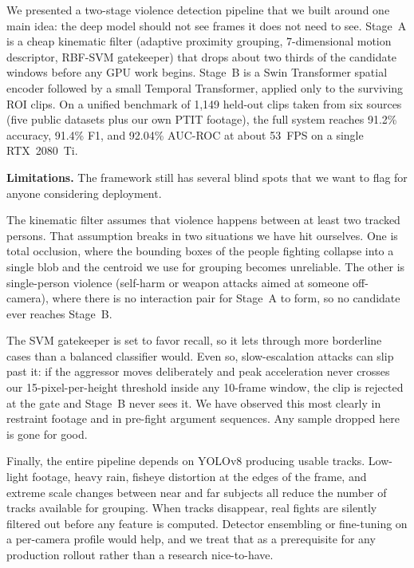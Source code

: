 \documentclass[conference]{IEEEtran}
\begin{document}
We presented a two-stage violence detection pipeline that we built around one main idea: the deep model should not see frames it does not need to see. Stage~A is a cheap kinematic filter (adaptive proximity grouping, 7-dimensional motion descriptor, RBF-SVM gatekeeper) that drops about two thirds of the candidate windows before any GPU work begins. Stage~B is a Swin Transformer spatial encoder followed by a small Temporal Transformer, applied only to the surviving ROI clips. On a unified benchmark of 1,149 held-out clips taken from six sources (five public datasets plus our own PTIT footage), the full system reaches 91.2\% accuracy, 91.4\% F1, and 92.04\% AUC-ROC at about 53~FPS on a single RTX~2080~Ti.

\vspace{0.15cm}
\noindent\textbf{Limitations.} The framework still has several blind spots that we want to flag for anyone considering deployment.

The kinematic filter assumes that violence happens between at least two tracked persons. That assumption breaks in two situations we have hit ourselves. One is total occlusion, where the bounding boxes of the people fighting collapse into a single blob and the centroid we use for grouping becomes unreliable. The other is single-person violence (self-harm or weapon attacks aimed at someone off-camera), where there is no interaction pair for Stage~A to form, so no candidate ever reaches Stage~B.

The SVM gatekeeper is set to favor recall, so it lets through more borderline cases than a balanced classifier would. Even so, slow-escalation attacks can slip past it: if the aggressor moves deliberately and peak acceleration never crosses our 15-pixel-per-height threshold inside any 10-frame window, the clip is rejected at the gate and Stage~B never sees it. We have observed this most clearly in restraint footage and in pre-fight argument sequences. Any sample dropped here is gone for good.

Finally, the entire pipeline depends on YOLOv8 producing usable tracks. Low-light footage, heavy rain, fisheye distortion at the edges of the frame, and extreme scale changes between near and far subjects all reduce the number of tracks available for grouping. When tracks disappear, real fights are silently filtered out before any feature is computed. Detector ensembling or fine-tuning on a per-camera profile would help, and we treat that as a prerequisite for any production rollout rather than a research nice-to-have.
\end{document}
